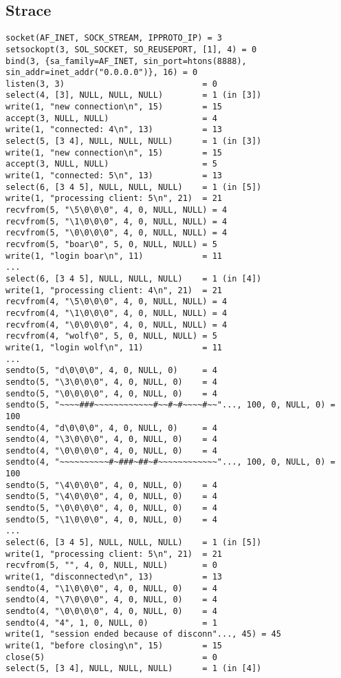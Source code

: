 \documentclass[12pt]{article}
\begin{document}
\subsection*{Strace}
\begin{verbatim}
socket(AF_INET, SOCK_STREAM, IPPROTO_IP) = 3
setsockopt(3, SOL_SOCKET, SO_REUSEPORT, [1], 4) = 0
bind(3, {sa_family=AF_INET, sin_port=htons(8888), sin_addr=inet_addr("0.0.0.0")}, 16) = 0
listen(3, 3)                            = 0
select(4, [3], NULL, NULL, NULL)        = 1 (in [3])
write(1, "new connection\n", 15)        = 15
accept(3, NULL, NULL)                   = 4
write(1, "connected: 4\n", 13)          = 13
select(5, [3 4], NULL, NULL, NULL)      = 1 (in [3])
write(1, "new connection\n", 15)        = 15
accept(3, NULL, NULL)                   = 5
write(1, "connected: 5\n", 13)          = 13
select(6, [3 4 5], NULL, NULL, NULL)    = 1 (in [5])
write(1, "processing client: 5\n", 21)  = 21
recvfrom(5, "\5\0\0\0", 4, 0, NULL, NULL) = 4
recvfrom(5, "\1\0\0\0", 4, 0, NULL, NULL) = 4
recvfrom(5, "\0\0\0\0", 4, 0, NULL, NULL) = 4
recvfrom(5, "boar\0", 5, 0, NULL, NULL) = 5
write(1, "login boar\n", 11)            = 11
...
select(6, [3 4 5], NULL, NULL, NULL)    = 1 (in [4])
write(1, "processing client: 4\n", 21)  = 21
recvfrom(4, "\5\0\0\0", 4, 0, NULL, NULL) = 4
recvfrom(4, "\1\0\0\0", 4, 0, NULL, NULL) = 4
recvfrom(4, "\0\0\0\0", 4, 0, NULL, NULL) = 4
recvfrom(4, "wolf\0", 5, 0, NULL, NULL) = 5
write(1, "login wolf\n", 11)            = 11
...
sendto(5, "d\0\0\0", 4, 0, NULL, 0)     = 4
sendto(5, "\3\0\0\0", 4, 0, NULL, 0)    = 4
sendto(5, "\0\0\0\0", 4, 0, NULL, 0)    = 4
sendto(5, "~~~~###~~~~~~~~~~~~#~~#~#~~~~#~~"..., 100, 0, NULL, 0) = 100
sendto(4, "d\0\0\0", 4, 0, NULL, 0)     = 4
sendto(4, "\3\0\0\0", 4, 0, NULL, 0)    = 4
sendto(4, "\0\0\0\0", 4, 0, NULL, 0)    = 4
sendto(4, "~~~~~~~~~~#~###~##~#~~~~~~~~~~~~"..., 100, 0, NULL, 0) = 100
sendto(5, "\4\0\0\0", 4, 0, NULL, 0)    = 4
sendto(5, "\4\0\0\0", 4, 0, NULL, 0)    = 4
sendto(5, "\0\0\0\0", 4, 0, NULL, 0)    = 4
sendto(5, "\1\0\0\0", 4, 0, NULL, 0)    = 4
...
select(6, [3 4 5], NULL, NULL, NULL)    = 1 (in [5])
write(1, "processing client: 5\n", 21)  = 21
recvfrom(5, "", 4, 0, NULL, NULL)       = 0
write(1, "disconnected\n", 13)          = 13
sendto(4, "\1\0\0\0", 4, 0, NULL, 0)    = 4
sendto(4, "\7\0\0\0", 4, 0, NULL, 0)    = 4
sendto(4, "\0\0\0\0", 4, 0, NULL, 0)    = 4
sendto(4, "4", 1, 0, NULL, 0)           = 1
write(1, "session ended because of disconn"..., 45) = 45
write(1, "before closing\n", 15)        = 15
close(5)                                = 0
select(5, [3 4], NULL, NULL, NULL)      = 1 (in [4])

\end{verbatim}
\end{document}
